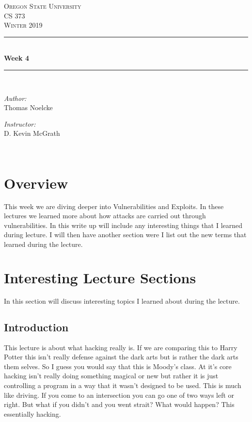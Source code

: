 \documentclass[letterpaper, onecolumn,10pt]{IEEEtran}
\begin{document}
    \begin{titlepage}
    \newcommand{\HRule}{\rule{\linewidth}{0.5mm}}
    \center
    \textsc{\Large Oregon State University}\\[1.5cm]
    \textsc{\Large CS 373}\\[0.5cm]
    \textsc{\Large Winter 2019}\\[0.5cm]
    \HRule \\[0.4cm]
    { \huge \bfseries Week 4}\\[0.4cm] %
    \HRule \\[1.5cm]
    \begin{minipage}{0.4\textwidth}
        \begin{flushleft} \large
        \emph{Author:}\\
        Thomas Noelcke
        \end{flushleft}
    \end{minipage}
    \begin{minipage}{0.4\textwidth}
        \begin{flushright} \large
        \emph{Instructor:} \\
        D. Kevin McGrath\\
        \end{flushright}
    \end{minipage}\\[2cm]
		\end{titlepage}
		
		\section{Overview}
		This week we are diving deeper into Vulnerabilities and Exploits. In these lectures we learned more about how attacks are carried out through vulnerabilities. In this write up will include any interesting things that I learned during lecture. I will then have another section were I list out the new terms that  learned during the lecture.\\
		
		\section{Interesting Lecture Sections}
		    In this section will discuss interesting topics I learned about during the lecture.\\
		    
		    \subsection{Introduction}
		    This lecture is about what hacking really is. If we are comparing this to Harry Potter this isn't really defense against the dark arts but is rather the dark arts them selves. So I guess you would say that this is Moody's class. At it's core hacking isn't really doing something magical or new but rather it is just controlling a program in a way that it wasn't designed to be used. This is much like driving. If you come to an intersection you can go one of two ways left or right. But what if you didn't and you went strait? What would happen? This essentially hacking.\\
		    
\end{document}
